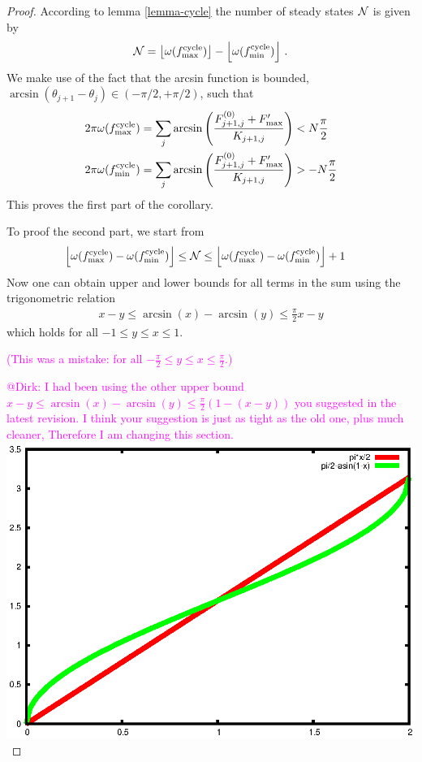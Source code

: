 \documentclass[10pt,aps,pre,preprint,superscriptaddress]{revtex4-1}
\newcommand{\debsankha}[1]{\textcolor{magenta}{#1}}
\newcommand{\nn}{\nonumber}
\newcommand{\N}{{\cal N}}
\newcommand{\floor}[1]{\left\lfloor #1 \right \rfloor}
\begin{document}
\begin{proof}
According to lemma \ref{lemma-cycle} the number of steady states $\N$ 
is given by
\begin{align}
    \N = \floor{\omega(f^{\rm cycle}_{\max})} -
       \floor{\omega(f^{\rm cycle}_{\min})} \, .
\end{align}  
We make use of the fact that the arcsin function is bounded, 
$\arcsin(\theta_{j+1}-\theta_j) \in (-\pi/2,+\pi/2)$, such that   
\begin{align}
   2\pi \omega(f^{\rm cycle}_{\rm max}) &= 
       \sum_j \arcsin \left(\frac{F_{j+1,j}^{(0)}+F'_{\rm max}}{K_{j+1,j}}\right)
     < N \frac{\pi}{2}   \nn \\
    2\pi \omega (f^{\rm cycle}_{\rm min}) &= 
       \sum_j \arcsin \left(\frac{F_{j+1,j}^{(0)}+F'_{\rm max}}{K_{j+1,j}}\right)
     > - N \frac{\pi}{2}    
\end{align}
This proves the first part of the corollary.

To proof the second part, we start from 
\begin{align}
   \label{eq:nf-bounds}
   \floor{\omega(f^{\rm cycle}_{\rm max}) - \omega(f^{\rm cycle}_{\rm min})} 
      &\leq \N \leq 
    \floor{\omega(f^{\rm cycle}_{\rm max}) - \omega(f^{\rm cycle}_{\rm min})} +1  
\end{align}
Now one can obtain upper and lower bounds for all terms in the
sum using the trigonometric relation 
\begin{align}
   \label{eqn:xy-arcsin}
   x-y\leq \arcsin(x)-\arcsin(y)\leq \frac{\pi}{2}x-y
\end{align}
which holds for all $-1\leq y \leq x \leq 1$.

\debsankha{(This was a mistake: for all $-\frac{\pi}{2}\leq y \leq x \leq \frac{\pi}{2}$.)}

\begin{minipage}{\columnwidth}
\debsankha{@Dirk: I had been using the other upper bound 
$x-y\leq \arcsin(x)-\arcsin(y)\leq \frac{\pi}{2}(1-(x-y))$ you suggested in 
the latest revision.  I think your suggestion is just as tight as the old one, 
plus much cleaner, 
Therefore I am changing this section.  }
\includegraphics[width=0.6\columnwidth]{pics/arcsin_upper_bounds}
\end{minipage}




\end{proof}
\end{document}
